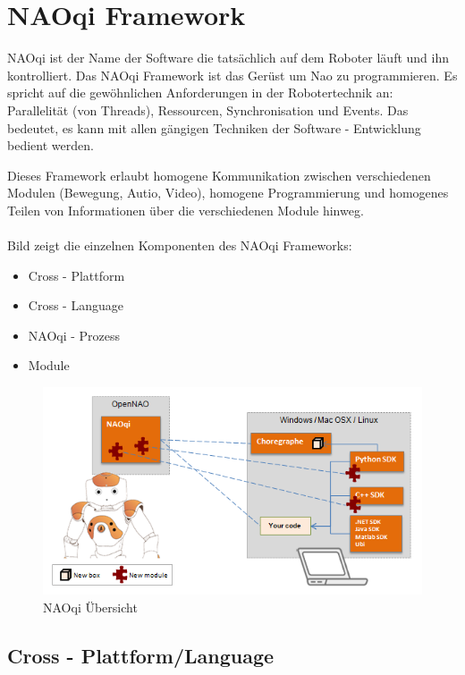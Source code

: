 \section{NAOqi Framework}

NAOqi ist der Name der Software die tatsächlich auf dem Roboter läuft und ihn kontrolliert. Das NAOqi Framework ist das Gerüst um Nao zu programmieren. Es spricht auf die gewöhnlichen Anforderungen in der Robotertechnik an: Parallelität (von Threads), Ressourcen, Synchronisation und Events. Das bedeutet, es kann mit allen gängigen Techniken der Software - Entwicklung bedient werden. 

Dieses Framework erlaubt homogene Kommunikation zwischen verschiedenen Modulen (Bewegung, Autio, Video), homogene Programmierung und homogenes Teilen von Informationen über die verschiedenen Module hinweg.
\\
\\
\noindent
Bild  zeigt die einzelnen Komponenten des NAOqi Frameworks:
\begin{itemize}
\item Cross - Plattform
\item Cross - Language
\item NAOqi - Prozess
\item Module
\end{itemize}

\begin{figure}[H]						
	\centering							
	\includegraphics[scale=0.8]{Bilder/naoqi_ov.PNG}
	\caption{NAOqi Übersicht}						
	\label{f:naoqi_ov}						
\end{figure}


\subsection{Cross - Plattform/Language}

